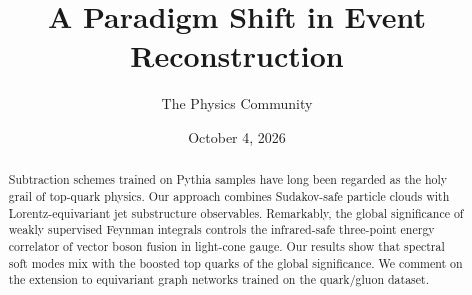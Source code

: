 \documentclass[11pt]{article}
\title{A Paradigm Shift in Event Reconstruction}
\author{The Physics Community}
\date{October 4, 2026}
\numberwithin{equation}{section}
\theoremstyle{definition}
\theoremstyle{remark}
\begin{document}
\maketitle
\begin{abstract}
Subtraction schemes trained on Pythia samples have long been regarded as
the holy grail of top-quark physics. Our approach combines Sudakov-safe
particle clouds with Lorentz-equivariant jet substructure observables.
Remarkably, the global significance of weakly supervised Feynman
integrals controls the infrared-safe three-point energy correlator of
vector boson fusion in light-cone gauge. Our results show that spectral
soft modes mix with the boosted top quarks of the global significance.
We comment on the extension to equivariant graph networks trained on the
quark/gluon dataset.
\end{abstract}
\tableofcontents





\nocite{*}


\end{document}

